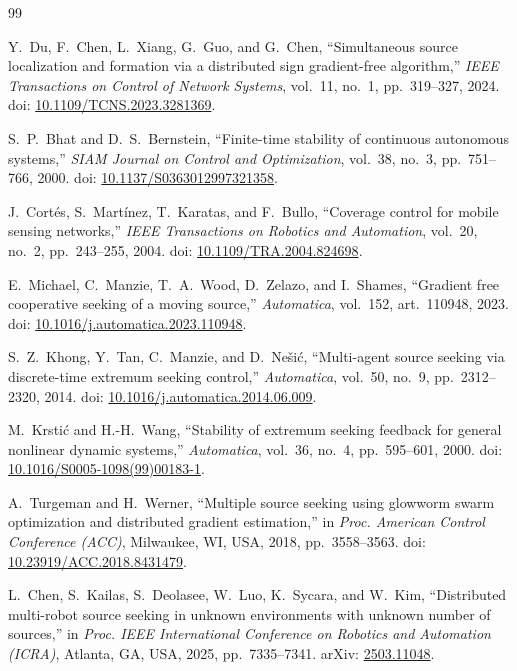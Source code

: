 \documentclass[11pt]{article}
\begin{document}
\begin{thebibliography}{99}

Y.~Du, F.~Chen, L.~Xiang, G.~Guo, and G.~Chen,
``Simultaneous source localization and formation via a distributed sign gradient-free algorithm,''
\emph{IEEE Transactions on Control of Network Systems}, vol.~11, no.~1, pp.~319--327, 2024.
doi: \href{https://doi.org/10.1109/TCNS.2023.3281369}{10.1109/TCNS.2023.3281369}.

S.~P.~Bhat and D.~S.~Bernstein,
``Finite-time stability of continuous autonomous systems,''
\emph{SIAM Journal on Control and Optimization}, vol.~38, no.~3, pp.~751--766, 2000.
doi: \href{https://doi.org/10.1137/S0363012997321358}{10.1137/S0363012997321358}.

J.~Cort{\'e}s, S.~Mart{\'i}nez, T.~Karatas, and F.~Bullo,
``Coverage control for mobile sensing networks,''
\emph{IEEE Transactions on Robotics and Automation}, vol.~20, no.~2, pp.~243--255, 2004.
doi: \href{https://doi.org/10.1109/TRA.2004.824698}{10.1109/TRA.2004.824698}.

E.~Michael, C.~Manzie, T.~A.~Wood, D.~Zelazo, and I.~Shames,
``Gradient free cooperative seeking of a moving source,''
\emph{Automatica}, vol.~152, art.~110948, 2023.
doi: \href{https://doi.org/10.1016/j.automatica.2023.110948}{10.1016/j.automatica.2023.110948}.

S.~Z.~Khong, Y.~Tan, C.~Manzie, and D.~Ne\v{s}i{\'c},
``Multi-agent source seeking via discrete-time extremum seeking control,''
\emph{Automatica}, vol.~50, no.~9, pp.~2312--2320, 2014.
doi: \href{https://doi.org/10.1016/j.automatica.2014.06.009}{10.1016/j.automatica.2014.06.009}.

M.~Krsti{\'c} and H.-H.~Wang,
``Stability of extremum seeking feedback for general nonlinear dynamic systems,''
\emph{Automatica}, vol.~36, no.~4, pp.~595--601, 2000.
doi: \href{https://doi.org/10.1016/S0005-1098(99)00183-1}{10.1016/S0005-1098(99)00183-1}.

A.~Turgeman and H.~Werner,
``Multiple source seeking using glowworm swarm optimization and distributed gradient estimation,''
in \emph{Proc. American Control Conference (ACC)}, Milwaukee, WI, USA, 2018, pp.~3558--3563.
doi: \href{https://doi.org/10.23919/ACC.2018.8431479}{10.23919/ACC.2018.8431479}.

L.~Chen, S.~Kailas, S.~Deolasee, W.~Luo, K.~Sycara, and W.~Kim,
``Distributed multi-robot source seeking in unknown environments with unknown number of sources,''
in \emph{Proc. IEEE International Conference on Robotics and Automation (ICRA)}, Atlanta, GA, USA, 2025, pp.~7335--7341.
arXiv: \href{https://arxiv.org/abs/2503.11048}{2503.11048}.


\end{thebibliography}
\end{document}
